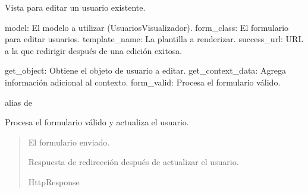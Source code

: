 \documentclass[letterpaper,10pt,spanish]{sphinxmanual}
\begin{document}
\begin{fulllineitems}

\pysigstartsignatures
{}
\pysigstopsignatures
\sphinxAtStartPar
Vista para editar un usuario existente.
\begin{description}
\sphinxAtStartPar
model: El modelo a utilizar (UsuariosVisualizador).
form\_class: El formulario para editar usuarios.
template\_name: La plantilla a renderizar.
success\_url: URL a la que redirigir después de una edición exitosa.

\sphinxAtStartPar
get\_object: Obtiene el objeto de usuario a editar.
get\_context\_data: Agrega información adicional al contexto.
form\_valid: Procesa el formulario válido.

\end{description}


\begin{fulllineitems}

\pysigstartsignatures
{}
\pysigstopsignatures
\sphinxAtStartPar
alias de 

\end{fulllineitems}



\begin{fulllineitems}

\pysigstartsignatures
{}
\pysigstopsignatures
\sphinxAtStartPar
Procesa el formulario válido y actualiza el usuario.
\begin{quote}\begin{description}
\sphinxAtStartPar
{} \textendash{} El formulario enviado.

\sphinxAtStartPar
Respuesta de redirección después de actualizar el usuario.

\sphinxAtStartPar
HttpResponse

\end{description}\end{quote}

\end{fulllineitems}




\end{fulllineitems}
\end{document}

